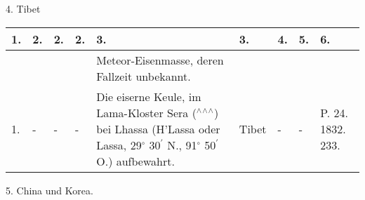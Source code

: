 \documentclass[a4paper, 8pt, oneside, polutonikogreek, german]{article}
\begin{document}
4. Tibet
\begin{table}[!ht]
    \centering
    \footnotesize
    \begin{tabular}{|p{3mm}|p{5mm}|p{4mm}|p{13mm}|p{22mm}|p{14mm}|p{10mm}|p{10mm}|p{13mm}|}
    \hline
        1. & 2. & 2. & 2. & 3. & 3. & 4. & 5. & 6. \\ \hline
          &   &   &   & Meteor-Eisenmasse, deren Fallzeit unbekannt. &   &   &   &   \\ \hline
        1. & - & - & - & Die eiserne Keule, im Lama-Kloster Sera ($^\wedge$$^\wedge$$^\wedge$) bei Lhassa (H’Lassa oder Lassa, 29$^\circ$ 30$^\prime$ N., 91$^\circ$ 50$^\prime$ O.) aufbewahrt. & Tibet & - & - & P. 24. 1832. 233. \\ \hline
    \end{tabular}
\end{table}
5. China und Korea.
\end{document}
